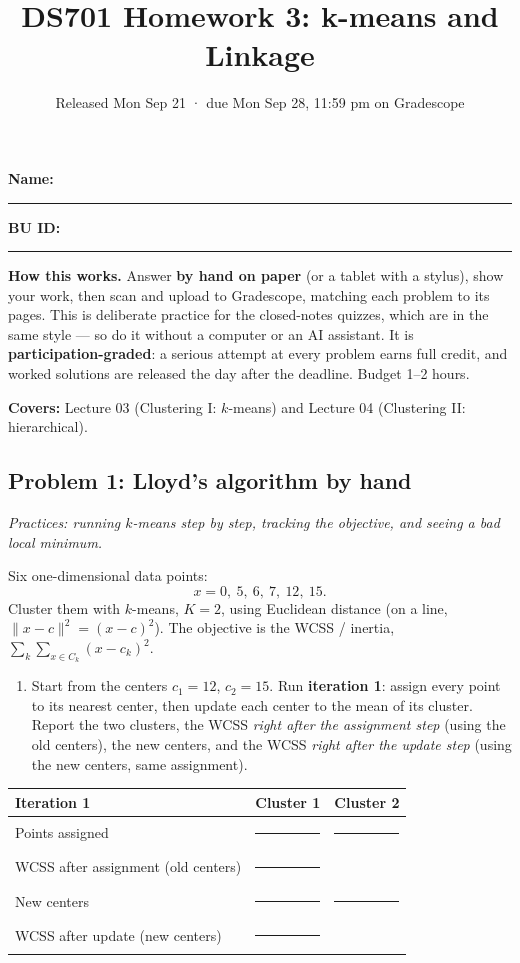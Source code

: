 \documentclass[
  11pt,
]{article}
\title{DS701 Homework 3: k-means and Linkage}
\subtitle{Released Mon Sep 21 · due Mon Sep 28, 11:59 pm on Gradescope}
\author{}
\date{}
\newcounter{none} %
\providecommand{\tightlist}{%
  \setlength{\itemsep}{0pt}\setlength{\parskip}{0pt}}
\newcommand{\blank}[1][1.2in]{\rule{#1}{0.4pt}}
\begin{document}
\maketitle


\noindent\textbf{Name:}\ \rule{2.0in}{0.4pt}\qquad\textbf{BU ID:}\ \rule{1.2in}{0.4pt}
\vspace{6pt}

\textbf{How this works.} Answer \textbf{by hand on paper} (or a tablet
with a stylus), show your work, then scan and upload to Gradescope,
matching each problem to its pages. This is deliberate practice for the
closed-notes quizzes, which are in the same style --- so do it without a
computer or an AI assistant. It is \textbf{participation-graded}: a
serious attempt at every problem earns full credit, and worked solutions
are released the day after the deadline. Budget 1--2 hours.

\textbf{Covers:} Lecture 03 (Clustering I: \(k\)-means) and Lecture 04
(Clustering II: hierarchical).

\subsection{Problem 1: Lloyd's algorithm by
hand}\label{problem-1-lloyds-algorithm-by-hand}

\emph{Practices: running \(k\)-means step by step, tracking the
objective, and seeing a bad local minimum.}

Six one-dimensional data points: \[x = 0,\ 5,\ 6,\ 7,\ 12,\ 15 .\]
Cluster them with \(k\)-means, \(K = 2\), using Euclidean distance (on a
line, \(\|x-c\|^2 = (x-c)^2\)). The objective is the WCSS / inertia,
\(\sum_k \sum_{x\in C_k}(x-c_k)^2\).

\begin{enumerate}
\def\labelenumi{(\alph{enumi})}
\tightlist
\item
  Start from the centers \(c_1 = 12\), \(c_2 = 15\). Run
  \textbf{iteration 1}: assign every point to its nearest center, then
  update each center to the mean of its cluster. Report the two
  clusters, the WCSS \emph{right after the assignment step} (using the
  old centers), the new centers, and the WCSS \emph{right after the
  update step} (using the new centers, same assignment).
\end{enumerate}

{\def\LTcaptype{none} %
\begin{longtable}[]{@{}lll@{}}
\toprule\noalign{}
Iteration 1 & Cluster 1 & Cluster 2 \\
\midrule\noalign{}
\endhead
\bottomrule\noalign{}
\endlastfoot
Points assigned & \blank[1.6in] & \blank[1.6in] \\
WCSS after assignment (old centers) & \blank[1.6in] & \\
New centers & \blank[1.6in] & \blank[1.6in] \\
WCSS after update (new centers) & \blank[1.6in] & \\
\end{longtable}
}
\end{document}
